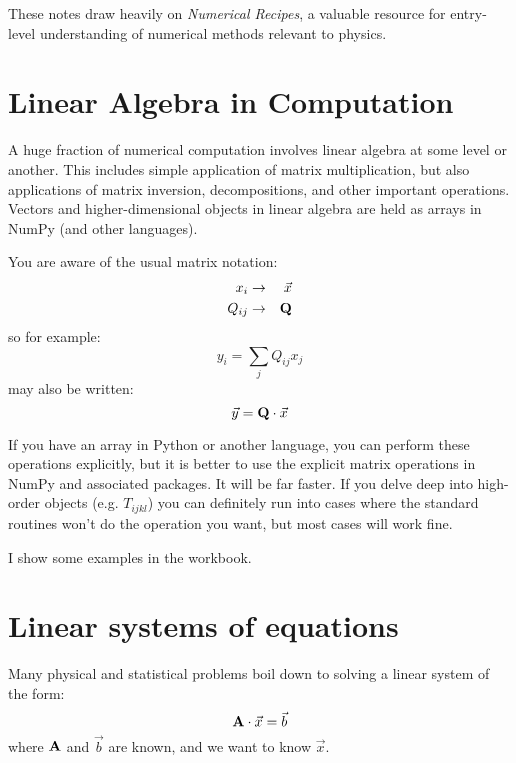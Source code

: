 These notes draw heavily on {\it Numerical Recipes}, a valuable
resource for entry-level understanding of numerical methods relevant
to physics.

\section{Linear Algebra in Computation}

A huge fraction of numerical computation involves linear algebra at
some level or another. This includes simple application of matrix
multiplication, but also applications of matrix inversion,
decompositions, and other important operations.  Vectors and
higher-dimensional objects in linear algebra are held as arrays in
NumPy (and other languages).

You are aware of the usual matrix notation:
\begin{eqnarray}
x_i &\rightarrow& \vec{x} \cr
Q_{ij} &\rightarrow& {\bf Q}
\end{eqnarray}
so for example:
\begin{equation}
y_i = \sum_j Q_{ij} x_j
\end{equation}
may also be written:
\begin{equation}
\vec{y} = {\bf Q}\cdot \vec{x}
\end{equation}

If you have an array in Python or another language, you can perform
these operations explicitly, but it is better to use the explicit
matrix operations in NumPy and associated packages. It will be far
faster. If you delve deep into high-order objects (e.g. $T_{ijkl}$)
you can definitely run into cases where the standard routines won't do
the operation you want, but most cases will work fine.

I show some examples in the workbook.

\section{Linear systems of equations}

Many physical and statistical problems boil down to solving a linear
system of the form:
\begin{equation}
{\bf A} \cdot \vec{x} = \vec{b}
\end{equation}
where ${\bf A}$ and $\vec{b}$ are known, and we want to know
$\vec{x}$.



